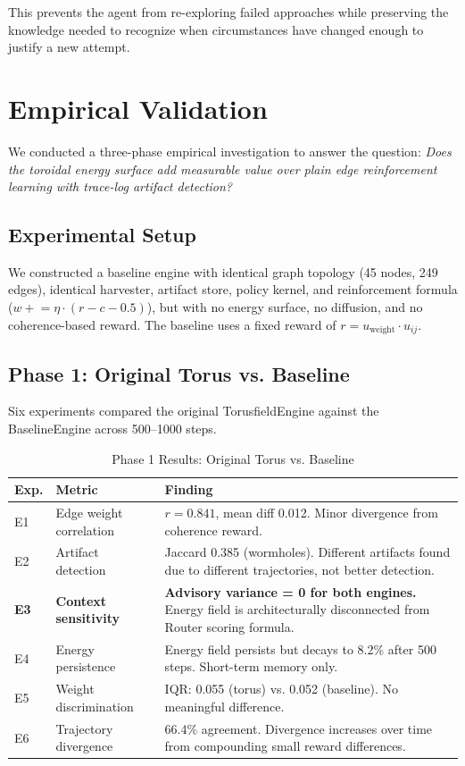 \documentclass[11pt,a4paper]{article}
\begin{document}
This prevents the agent from re-exploring failed approaches while
preserving the knowledge needed to recognize when circumstances
have changed enough to justify a new attempt.


\section{Empirical Validation}
\label{sec:validation}

We conducted a three-phase empirical investigation to answer the
question: \emph{Does the toroidal energy surface add measurable
value over plain edge reinforcement learning with trace-log artifact
detection?}

\subsection{Experimental Setup}

We constructed a baseline engine with identical graph topology
(45 nodes, 249 edges), identical harvester, artifact store, policy
kernel, and reinforcement formula ($w \mathrel{+}= \eta \cdot (r - c - 0.5)$),
but with no energy surface, no diffusion, and no coherence-based
reward. The baseline uses a fixed reward of
$r = u_{\text{weight}} \cdot u_{ij}$.

\subsection{Phase 1: Original Torus vs. Baseline}

Six experiments compared the original TorusfieldEngine against the
BaselineEngine across 500--1000 steps.

\begin{table}[h]
\centering
\caption{Phase 1 Results: Original Torus vs. Baseline}
\label{tab:phase1}
\begin{tabular}{@{}llp{6.5cm}@{}}
\toprule
\textbf{Exp.} & \textbf{Metric} & \textbf{Finding} \\
\midrule
E1 & Edge weight correlation & $r = 0.841$, mean diff 0.012. Minor divergence from coherence reward. \\
E2 & Artifact detection & Jaccard 0.385 (wormholes). Different artifacts found due to different trajectories, not better detection. \\
\textbf{E3} & \textbf{Context sensitivity} & \textbf{Advisory variance = 0 for both engines.} Energy field is architecturally disconnected from Router scoring formula. \\
E4 & Energy persistence & Energy field persists but decays to 8.2\% after 500 steps. Short-term memory only. \\
E5 & Weight discrimination & IQR: 0.055 (torus) vs. 0.052 (baseline). No meaningful difference. \\
E6 & Trajectory divergence & 66.4\% agreement. Divergence increases over time from compounding small reward differences. \\
\bottomrule
\end{tabular}
\end{table}
\end{document}
